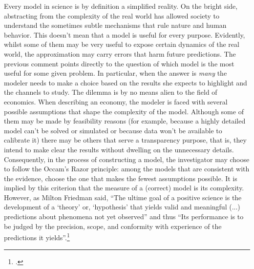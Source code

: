 \documentclass[english, a4paper,12pt]{article}
\begin{document}
Every model in science is by definition a simplified reality. On the bright side, abstracting from the complexity of the real world has allowed society to understand the sometimes subtle mechanisms that rule nature and human behavior. This doesn't mean that a model is useful for every purpose. Evidently, whilst some of them may be very useful to expose certain dynamics of the real world, the approximation may carry errors that harm future predictions. The previous comment points directly to the question of which model is the most useful for some given problem. In particular, when the answer is \textit{many} the modeler needs to make a choice based on the results she expects to highlight and the channels to study. The dilemma is by no means alien to the field of economics. When describing an economy, the modeler is faced with several possible assumptions that shape the complexity of the model. Although some of them may be made by feasibility reasons (for example, because a highly detailed model can't be solved or simulated or because data won't be available to calibrate it) there may be others that serve a transparency purpose, that is, they intend to make clear the results without dwelling on the unnecessary details. Consequently, in the process of constructing a model, the investigator may choose to follow the Occam's Razor principle: among the models that are consistent with the evidence, choose the one that makes the fewest assumptions possible. It is implied by this criterion that the measure of a (correct) model is its complexity. However, as Milton Friedman said, ``The ultime goal of a positive science is the development of a `theory' or, `hypothesis' that yields valid and meaningful (...) predictions about phenomena not yet observed'' and thus ``Its performance is to be judged by the precision, scope, and conformity with experience of the predictions it yields''.\footnote{\cite{FriedmanPositive}.}
\end{document}

